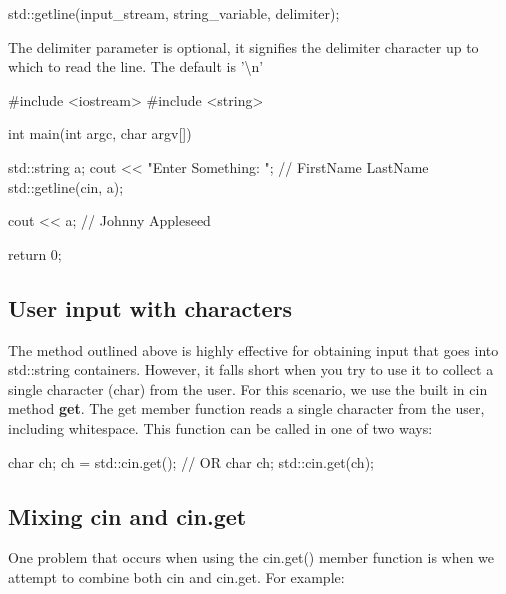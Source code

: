 \documentclass{report}
\begin{document}
    \begin{cppcode}
                    std::getline(input_stream, string_variable, delimiter);
    \end{cppcode}
    \bigbreak \noindent 
    
    \begin{notebox}
			The delimiter parameter is optional, it signifies the delimiter character up to which to read the line. The default is '\textbackslash n'
		\end{notebox}
    \bigbreak \noindent 
    
    \begin{cppcode}
#include <iostream>
#include <string>

int main(int argc, char argv[]){

    std::string a;
    cout << "Enter Something: "; // FirstName LastName
    std::getline(cin, a);

    cout << a; // Johnny Appleseed

    return 0;
}
    \end{cppcode}
    

    \pagebreak
    \subsection{User input with characters}
    \bigbreak \noindent 
    The method outlined above is highly effective for obtaining input that goes into std::string containers. However, it falls short when you try to use it to collect a single character (char) from the user. 
    \bigbreak \noindent 
    For this scenario, we use the built in cin method \textbf{get}. The get member function reads a single character from the user, including whitespace. 
    \bigbreak \noindent 
    This function can be called in one of two ways:
    \smallbreak \noindent
    
    \begin{cppcode}
char ch;
ch = std::cin.get();
// OR 
char ch;
std::cin.get(ch);
    \end{cppcode}
    

    \bigbreak \noindent 
    \subsection{Mixing cin and cin.get}
    \bigbreak \noindent 
    One problem that occurs when using the cin.get() member function is when we attempt to combine both cin and cin.get. For example:
    \smallbreak \noindent
    
\end{document}

